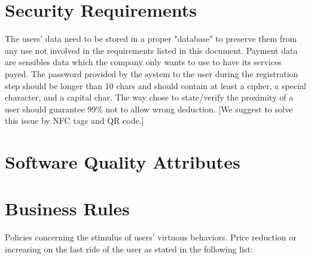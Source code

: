 \documentclass{scrreprt}
\begin{document}
\section{Security Requirements}
\label{sec:security}
The users' data need to be stored in a proper "database" to preserve them from any use not involved in the requirements listed in this document.
Payment data are sensibles data which the company only wants to use to have its services payed.
The password provided by the system to the user during the registration step should be longer than 10 chars and should contain at least a cipher, a special character, and a capital char.
The way chose to state/verify the proximity of a user should guarantee 99\% not to allow wrong deduction. [We suggest to solve this issue by NFC tags and QR code.]
\begin{comment}$<$Specify any requirements regarding security or privacy issues surrounding use 
of the product or protection of the data used or created by the product. Define 
any user identity authentication requirements. Refer to any external policies or 
regulations containing security issues that affect the product. Define any 
security or privacy certifications that must be satisfied.$>$
\end{comment}

\section{Software Quality Attributes}
\begin{comment}$<$Specify any additional quality characteristics for the product that will be 
important to either the users or the developers. Some to consider are: 
adaptability, availability, correctness, flexibility, interoperability, 
maintainability, portability, reliability, reusability, robustness, testability, 
and usability. Write these to be specific, quantitative, and verifiable when 
possible. At the least, clarify the relative preferences for various attributes, 
such as ease of use over ease of learning.$>$
\end{comment}

\section{Business Rules}
\label{sec:business}
Policies concerning the stimulus of users' virtuous behaviors. Price reduction or increasing on the last ride of the user as stated in the following list:
\end{document}
